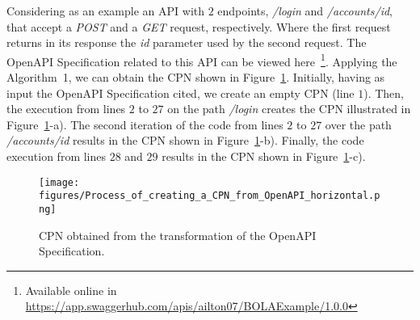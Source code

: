 Considering as an example an API with $2$ endpoints, \textit{/login} and \textit{/accounts/{id}}, that accept a \textit{POST} and a \textit{GET} request, respectively. Where the first request returns in its response the \textit{id} parameter used by the second request. The OpenAPI Specification related to this API can be viewed here~\footnote{Available online in \url{https://app.swaggerhub.com/apis/ailton07/BOLAExample/1.0.0}}. Applying the Algorithm~1, we can obtain the CPN shown in Figure~\ref{fig:CPN_OAS-BOLAExample}. Initially, having as input the OpenAPI Specification cited, we create an empty CPN (line $1$). Then, the execution from lines $2$ to $27$ on the path \textit{/login} creates the CPN illustrated in Figure~\ref{fig:CPN_OAS-BOLAExample}-a). The second iteration of the code from lines $2$ to $27$ over the path \textit{/accounts/{id}} results in the CPN shown in Figure~\ref{fig:CPN_OAS-BOLAExample}-b). Finally, the code execution from lines $28$ and $29$ results in the CPN shown in Figure~\ref{fig:CPN_OAS-BOLAExample}-c).


\begin{figure}[!htp]
    \center
    \texttt{[image: figures/Process\_of\_creating\_a\_CPN\_from\_OpenAPI\_horizontal.png]}
    \caption{CPN obtained from the transformation of the OpenAPI Specification.}
    \label{fig:CPN_OAS-BOLAExample}
\end{figure}


\TODO{\ldots}
